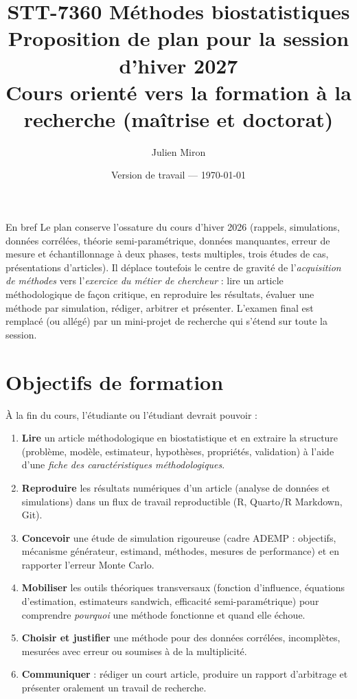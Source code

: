 \documentclass[11pt]{article}
\title{\textbf{STT-7360 Méthodes biostatistiques}\\[2pt]
\large Proposition de plan pour la session d'hiver 2027\\
\normalsize Cours orienté vers la formation à la recherche (maîtrise et doctorat)}
\author{Julien Miron}
\date{Version de travail --- \today}
\begin{document}
\maketitle

\begin{encadre}{En bref}
Le plan conserve l'ossature du cours d'hiver 2026 (rappels, simulations, données corrélées,
théorie semi-paramétrique, données manquantes, erreur de mesure et échantillonnage à deux phases,
tests multiples, trois études de cas, présentations d'articles). Il déplace toutefois le centre de
gravité de l'\emph{acquisition de méthodes} vers l'\emph{exercice du métier de chercheur} :
lire un article méthodologique de façon critique, en reproduire les résultats, évaluer une méthode
par simulation, rédiger, arbitrer et présenter. L'examen final est remplacé (ou allégé) par un
mini-projet de recherche qui s'étend sur toute la session.
\end{encadre}

\section{Objectifs de formation}

À la fin du cours, l'étudiante ou l'étudiant devrait pouvoir :
\begin{enumerate}[label=\textbf{O\arabic*.}]
  \item \textbf{Lire} un article méthodologique en biostatistique et en extraire la structure
        (problème, modèle, estimateur, hypothèses, propriétés, validation) à l'aide d'une
        \emph{fiche des caractéristiques méthodologiques}.
  \item \textbf{Reproduire} les résultats numériques d'un article (analyse de données et
        simulations) dans un flux de travail reproductible (R, Quarto/R Markdown, Git).
  \item \textbf{Concevoir} une étude de simulation rigoureuse (cadre ADEMP : objectifs,
        mécanisme générateur, estimand, méthodes, mesures de performance) et en rapporter
        l'erreur Monte Carlo.
  \item \textbf{Mobiliser} les outils théoriques transversaux (fonction d'influence, équations
        d'estimation, estimateurs sandwich, efficacité semi-paramétrique) pour comprendre
        \emph{pourquoi} une méthode fonctionne et quand elle échoue.
  \item \textbf{Choisir et justifier} une méthode pour des données corrélées, incomplètes,
        mesurées avec erreur ou soumises à de la multiplicité.
  \item \textbf{Communiquer} : rédiger un court article, produire un rapport d'arbitrage et
        présenter oralement un travail de recherche.
\end{enumerate}
\end{document}
